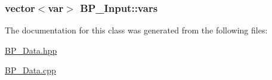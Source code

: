 \hypertarget{class_b_p___input_a57b4dee2857fb8155af4521fca27fb89}{
\subsubsection[{vars}]{\setlength{\rightskip}{0pt plus 5cm}vector$<${\bf var}$>$ B\-P\-\_\-\-Input\-::vars\hspace{0.3cm}{\ttfamily [protected]}}}\label{class_b_p___input_a57b4dee2857fb8155af4521fca27fb89}


The documentation for this class was generated from the following files\-:\begin{DoxyCompactItemize}
\item 
\hyperlink{_b_p___data_8hpp}{B\-P\-\_\-\-Data.\-hpp}\item 
\hyperlink{_b_p___data_8cpp}{B\-P\-\_\-\-Data.\-cpp}\end{DoxyCompactItemize}
